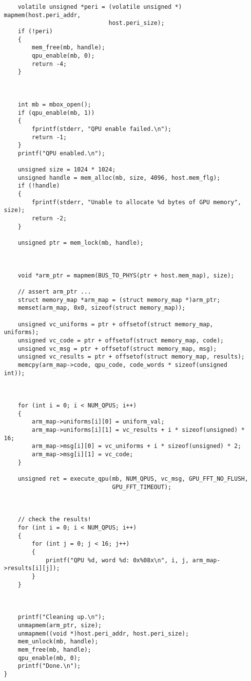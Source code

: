 \begin{lstlisting}
    volatile unsigned *peri = (volatile unsigned *) mapmem(host.peri_addr,
                              host.peri_size);
    if (!peri)
    {
        mem_free(mb, handle);
        qpu_enable(mb, 0);
        return -4;
    }



    int mb = mbox_open();
    if (qpu_enable(mb, 1))
    {
        fprintf(stderr, "QPU enable failed.\n");
        return -1;
    }
    printf("QPU enabled.\n");

    unsigned size = 1024 * 1024;
    unsigned handle = mem_alloc(mb, size, 4096, host.mem_flg);
    if (!handle)
    {
        fprintf(stderr, "Unable to allocate %d bytes of GPU memory", size);
        return -2;
    }

    unsigned ptr = mem_lock(mb, handle);



    void *arm_ptr = mapmem(BUS_TO_PHYS(ptr + host.mem_map), size);

    // assert arm_ptr ...
    struct memory_map *arm_map = (struct memory_map *)arm_ptr;
    memset(arm_map, 0x0, sizeof(struct memory_map));

    unsigned vc_uniforms = ptr + offsetof(struct memory_map, uniforms);
    unsigned vc_code = ptr + offsetof(struct memory_map, code);
    unsigned vc_msg = ptr + offsetof(struct memory_map, msg);
    unsigned vc_results = ptr + offsetof(struct memory_map, results);
    memcpy(arm_map->code, qpu_code, code_words * sizeof(unsigned int));



    for (int i = 0; i < NUM_QPUS; i++)
    {
        arm_map->uniforms[i][0] = uniform_val;
        arm_map->uniforms[i][1] = vc_results + i * sizeof(unsigned) * 16;
        arm_map->msg[i][0] = vc_uniforms + i * sizeof(unsigned) * 2;
        arm_map->msg[i][1] = vc_code;
    }

    unsigned ret = execute_qpu(mb, NUM_QPUS, vc_msg, GPU_FFT_NO_FLUSH,
                               GPU_FFT_TIMEOUT);



    // check the results!
    for (int i = 0; i < NUM_QPUS; i++)
    {
        for (int j = 0; j < 16; j++)
        {
            printf("QPU %d, word %d: 0x%08x\n", i, j, arm_map->results[i][j]);
        }
    }



    printf("Cleaning up.\n");
    unmapmem(arm_ptr, size);
    unmapmem((void *)host.peri_addr, host.peri_size);
    mem_unlock(mb, handle);
    mem_free(mb, handle);
    qpu_enable(mb, 0);
    printf("Done.\n");
}

\end{lstlisting}
